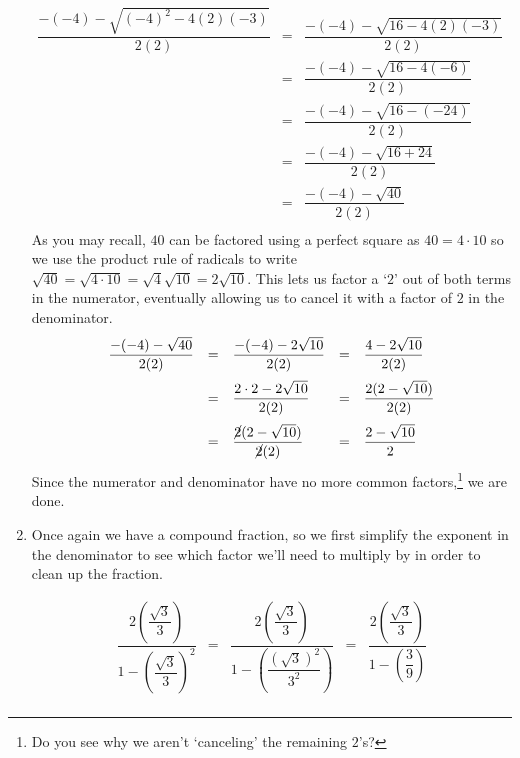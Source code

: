 \documentclass{ximera}
\begin{document}
\begin{example}
\begin{enumerate}
\[\begin{array}{rclr}
\dfrac{-(-4) -\sqrt{(-4)^2-4(2)(-3)}}{2(2)}  & = & \dfrac{-(-4) - \sqrt{16-4(2)(-3)}}{2(2)} & \\[12pt]
                                             & = & \dfrac{-(-4) - \sqrt{16-4(-6)}}{2(2)} & \\[12pt]
																						& = & \dfrac{-(-4) - \sqrt{16-(-24)}}{2(2)} & \\[12pt]
				                                     & = & \dfrac{-(-4) - \sqrt{16+24}}{2(2)} & \\[12pt]
																						    & = & \dfrac{-(-4) - \sqrt{40}}{2(2)} & \\ \end{array} \] As you may recall, $40$ can be factored using a perfect square as $40 = 4 \cdot 10$ so we use the product rule of radicals to write $\sqrt{40} = \sqrt{4 \cdot 10} = \sqrt{4} \sqrt{10} = 2 \sqrt{10}$.  This lets us factor a `$2$' out of both terms in the numerator, eventually allowing us to cancel it with a factor of $2$ in the denominator.\[ \begin{array}{rclcl}

 \dfrac{-(-4) - \sqrt{40}}{2(2)} & = &  \dfrac{-(-4) - 2\sqrt{10}}{2(2)} & = &  \dfrac{4  - 2\sqrt{10}}{2(2)} \\ [12pt]
                                 & = &  \dfrac{2 \cdot 2  - 2\sqrt{10}}{2(2)} & = &  \dfrac{2(2  - \sqrt{10})}{2(2)} \\ [12pt]
																& = &  \dfrac{\cancel{2}(2  - \sqrt{10})}{\cancel{2}(2)} & = &  \dfrac{2  - \sqrt{10}}{2} \\ \end{array} \]Since the numerator and denominator have no more common factors,\footnote{Do you see why we aren't `canceling' the remaining $2$'s?} we are done.

\item  Once again we have a compound fraction, so we first simplify the exponent in the denominator to see which factor we'll need to multiply by in order to clean up the fraction.

\[ \begin{array}{rclcl}

\dfrac{2 \left( \dfrac{\sqrt{3}}{3}\right)}{1 - \left( \dfrac{\sqrt{3}}{3} \right)^2} & = & \dfrac{2 \left( \dfrac{\sqrt{3}}{3}\right)}{1 - \left( \dfrac{(\sqrt{3})^2}{3^2} \right)} & = & \dfrac{2 \left( \dfrac{\sqrt{3}}{3}\right)}{1 - \left( \dfrac{3}{9} \right)}\\ [25pt]
																				

\end{array}\]
\end{enumerate}
\end{example}
\end{document}
